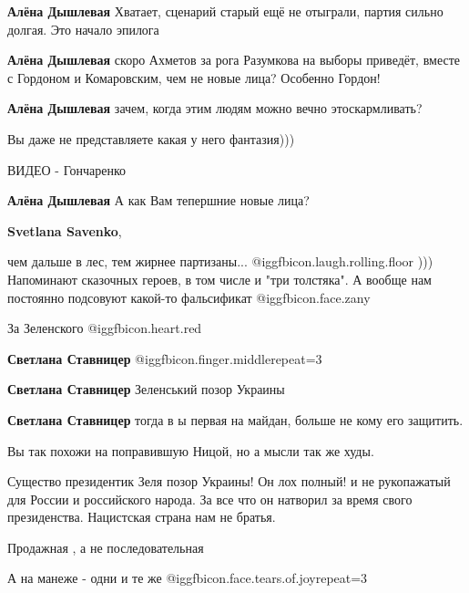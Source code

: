\begin{itemize}
\begin{itemize} %
\textbf{Алёна Дышлевая} Хватает, сценарий старый ещё не отыграли, партия сильно долгая. Это начало эпилога

\textbf{Алёна Дышлевая} скоро Ахметов за рога Разумкова на выборы приведёт, вместе с Гордоном и Комаровским, чем не новые лица? Особенно Гордон!

\textbf{Алёна Дышлевая} зачем, когда этим людям можно вечно этоскармливать?

Вы даже не представляете какая у него фантазия)))

ВИДЕО - Гончаренко

\textbf{Алёна Дышлевая} А как Вам тепершние новые лица?

\textbf{Svetlana Savenko}, 

чем дальше в лес, тем жирнее партизаны... @igg{fbicon.laugh.rolling.floor} ))) Напоминают сказочных героев, в
том числе и "три толстяка". А вообще нам постоянно подсовуют какой-то
фальсификат  @igg{fbicon.face.zany} 

\end{itemize} %

За Зеленского @igg{fbicon.heart.red}

\begin{itemize} %
\textbf{Светлана Ставницер}  @igg{fbicon.finger.middle}{repeat=3} 

\textbf{Светлана Ставницер} Зеленський позор Украины

\textbf{Светлана Ставницер} тогда в ы первая на майдан, больше не кому его защитить.

Вы так похожи на поправившую Ницой, но а мысли так же худы.


Существо президентик Зеля позор Украины! Он лох полный! и не рукопажатый для
России и российского народа. За все что он натворил за время свого
президенства. Нацистская страна нам не братья.

\end{itemize} %

Продажная , а не последовательная

А на манеже - одни и те же  @igg{fbicon.face.tears.of.joy}{repeat=3} 


\end{itemize}
